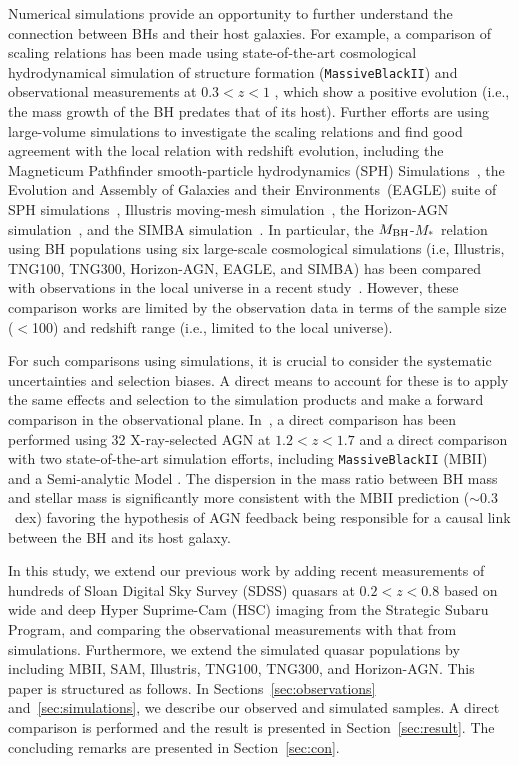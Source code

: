 \documentclass[twocolumn]{aastex631}
\def\smass{{$M_*$}}
\def\mbh{$M_{\rm BH}$}
\begin{document}
Numerical simulations provide an opportunity to further understand the connection between BHs and their host galaxies. For example, a comparison of scaling relations has been made using state-of-the-art cosmological hydrodynamical simulation of structure formation ({\tt MassiveBlackII}) and observational measurements at  $0.3<z<1$ \citep[e.g., ][]{DeG++15}, which show a positive evolution (i.e., the mass growth of the BH predates that of its host). Further efforts are using large-volume simulations to investigate the scaling relations and find good agreement with the local relation with redshift evolution, 
including the Magneticum Pathfinder smooth-particle hydrodynamics (SPH) Simulations~\citep{Steinborn2015}, the Evolution and Assembly of Galaxies and their Environments~(EAGLE) suite of SPH simulations~\citep{Schaye2015, Crain2015, McAlpine2016}, Illustris moving-mesh simulation~\citep{Genel2014, 2014MNRAS.444.1518V, Sijacki2015, Nelson2015, Li2019}, the Horizon-AGN simulation~\citep{2014MNRAS.444.1453D, 2016MNRAS.463.3948D, 2016MNRAS.460.2979V}, and the SIMBA simulation~\citep{Thomas2019, Dave2019}.
In particular, the \mbh-\smass\ relation using BH populations using six large-scale cosmological simulations (i.e, Illustris, TNG100, TNG300, Horizon-AGN, EAGLE, and SIMBA) has been compared with observations in the local universe in a recent study~\citep{Habouzit2021}. However, these comparison works are limited by the observation data in terms of the sample size ($<$100) and redshift range (i.e., limited to the local universe).

For such comparisons using simulations, it is crucial to consider the systematic uncertainties and selection biases. A direct means to account for these is to apply the same effects and selection to the simulation products and make a forward comparison in the observational plane. In~\citet{Ding2020b}, a direct comparison has been performed using 32 X-ray-selected AGN at $1.2<z<1.7$ and a direct comparison with two state-of-the-art simulation efforts, including {\tt MassiveBlackII} (MBII) and a Semi-analytic Model \citep[SAM,][]{Menci2014, Menci2016}. The dispersion in the mass ratio between BH mass and stellar mass is significantly more consistent with the MBII prediction ($\sim0.3$~dex) favoring the hypothesis of AGN feedback being responsible for a causal link between the BH and its host galaxy.

In this study, we extend our previous work by adding recent measurements of hundreds of Sloan Digital Sky Survey (SDSS) quasars at $0.2<z<0.8$ based on wide and deep Hyper Suprime-Cam (HSC) imaging from the Strategic Subaru Program, and comparing the observational measurements with that from simulations. Furthermore, we extend the simulated quasar populations by including MBII, SAM, Illustris, TNG100, TNG300, and Horizon-AGN. This paper is structured as follows. In Sections~\ref{sec:observations} and~\ref{sec:simulations}, we describe our observed and simulated samples. A direct comparison is performed and the result is presented in Section~\ref{sec:result}. The concluding remarks are presented in Section~\ref{sec:con}.
\end{document}
